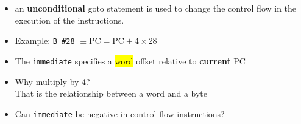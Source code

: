
 
\begin{frame}[fragile]

\begin{itemize}  
    \item an \textbf{unconditional} goto statement is used to change the control flow in the execution of the instructions.
    \item Example: \texttt{B \#28} $\equiv \text{PC} = \text{PC}+4\times28$
    \item The {\tt immediate} specifies a \hl{word} offset relative to \textbf{current} PC
\end{itemize}
\bigskip
\begin{tcolorbox}[enhanced,attach boxed title to top center={yshift=-3mm,yshifttext=-1mm},
  colback=blue!5!white,colframe=blue!75!black,colbacktitle=blue!80!black,
  title=Think About It,fonttitle=\bfseries,
  boxed title style={size=small,colframe=red!50!black} ]
  \begin{itemize}
      \item Why multiply by 4? \\
      That is the relationship between a word and a byte
    \item Can {\tt immediate} be negative in control flow instructions? \ifnum{}\fi
  \end{itemize}
\end{tcolorbox}
\BNotes\ifnum{}

\fi\ENotes
\end{frame}

